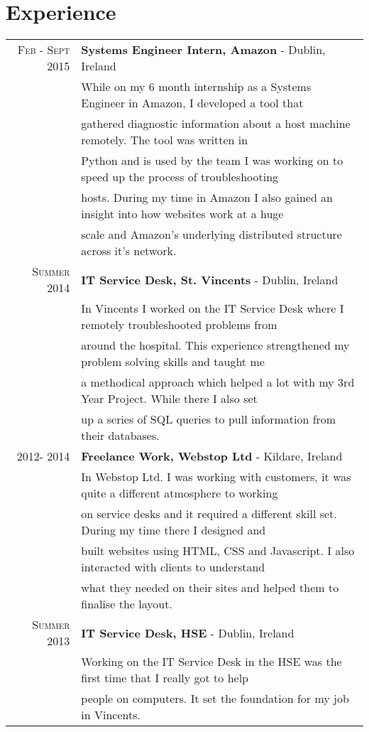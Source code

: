 \documentclass[10pt, letterpaper]{article}
\begin{document}
\section{Experience}
\begin{tabular}{rl}	
 \textsc{Feb - Sept} 2015 & \textbf{Systems Engineer Intern, Amazon} - Dublin, Ireland\\
& While on my 6 month internship as a Systems Engineer in Amazon, I developed a tool that\\
& gathered diagnostic information about a host machine remotely. The tool was written in\\
& Python and is used by the team I was working on to speed up the process of troubleshooting\\
& hosts. During my time in Amazon I also gained an insight into how websites work at a huge\\
& scale and Amazon's underlying distributed structure across it's network.\\
\textsc{Summer} 2014 & \textbf{IT Service Desk, St. Vincents} - Dublin, Ireland\\
& In Vincents I worked on the IT Service Desk where I remotely troubleshooted problems from\\ 
& around the hospital. This experience strengthened my problem solving skills and taught me\\ 
& a methodical approach which helped a lot with my 3rd Year Project. While there I also set\\
& up a series of SQL queries to pull information from their databases. \\
\textsc{2012-} 2014 & \textbf{Freelance Work, Webstop Ltd} - Kildare, Ireland\\
& In Webstop Ltd. I was working with customers, it was quite a different atmosphere to working\\ 
& on service desks and it required a different skill set. During my time there I designed and \\
& built websites using HTML, CSS and Javascript. I also interacted with clients to understand\\
& what they needed on their sites and helped them to finalise the layout.\\
\textsc{Summer} 2013 & \textbf{IT Service Desk, HSE} - Dublin, Ireland \\
& Working on the IT Service Desk in the HSE was the first time that I really got to help\\
& people on computers. It set the foundation for my job in Vincents. \\
\end{tabular}
\end{document}
